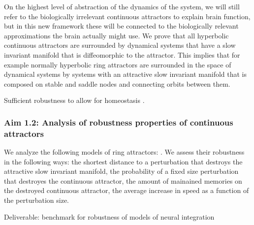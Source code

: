 \documentclass[12pt,letterpaper, onecolumn]{article}
\theoremstyle{definition}
\theoremstyle{remark}
\begin{document}
On the highest level of abstraction of the dynamics of the system, we will still refer to the biologically irrelevant continuous attractors to explain brain function, but in this new framework these will be connected to the biologically relevant approximations the brain actually might use.
We prove that all hyperbolic continuous attractors are surrounded by dynamical systems that have a slow invariant manifold that is diffeomorphic to the attractor. This implies that for example normally hyperbolic ring attractors are surrounded in the space of dynamical systems by systems with an attractive slow invariant manifold that is composed on stable and saddle nodes and connecting orbits between them.




%
Sufficient robustness to allow for homeostasis \citep{oleary2018homeostasis, niemeyer2021, kozachkov2022a, seeholzer2019}.



\subsubsection*{Aim 1.2: Analysis of robustness properties of continuous attractors}
 We analyze the following models of ring attractors: \citep{pollock2020, barak2021mapping, beiran2021, noorman2022}.
We assess their robustness in the following ways:
the shortest distance to a perturbation that destroys the attractive slow invariant manifold,
the probability of a fixed size perturbation that destroyes the continuous attractor,
the amount of mainained memories on the destroyed continuous attractor,
the average increase in speed as a function of the perturbation size.





Deliverable: benchmark for robustness of models of neural integration
\end{document}
